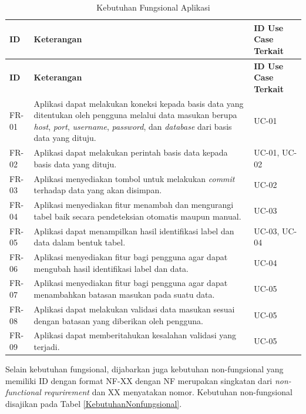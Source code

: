 	\begin{small}
	\begin{longtable}{ | p{2cm} | p{6cm} | p{4cm} | }
	    \caption{Kebutuhan Fungsional Aplikasi}
	    \label{KebutuhanFungsional}\\ \hline
	    \centering\bfseries{ID} & \centering\bfseries{Keterangan} & \centering\bfseries{ID Use Case Terkait} \tabularnewline \hline
	    \endfirsthead
	    \hline
	    \centering\bfseries{ID} & \centering\bfseries{Keterangan} & \centering\bfseries{ID Use Case Terkait} \tabularnewline \hline
	    \endhead
	    FR-01 & Aplikasi dapat melakukan koneksi kepada basis data yang ditentukan oleh pengguna melalui data masukan berupa \textit{host}, \textit{port}, \textit{username}, \textit{password}, dan \textit{database} dari basis data yang dituju. & UC-01 \\ \hline
	    FR-02 & Aplikasi dapat melakukan perintah basis data kepada basis data yang dituju. & UC-01, UC-02 \\ \hline
	    FR-03 & Aplikasi menyediakan tombol untuk melakukan \textit{commit} terhadap data yang akan disimpan. & UC-02 \\ \hline
	    FR-04 & Aplikasi menyediakan fitur menambah dan mengurangi tabel baik secara pendeteksian otomatis maupun manual. & UC-03 \\ \hline
	    FR-05 & Aplikasi dapat menampilkan hasil identifikasi label dan data dalam bentuk tabel. & UC-03, UC-04 \\ \hline
	    FR-06 & Aplikasi menyediakan fitur bagi pengguna agar dapat mengubah hasil identifikasi label dan data. & UC-04 \\ \hline
	    FR-07 & Aplikasi menyediakan fitur bagi pengguna agar dapat menambahkan batasan masukan pada suatu data. & UC-05 \\ \hline
	    FR-08 & Aplikasi dapat melakukan validasi data masukan sesuai dengan batasan yang diberikan oleh pengguna. & UC-05 \\ \hline
	    FR-09 & Aplikasi dapat memberitahukan kesalahan validasi yang terjadi. & UC-05 \\ \hline
	\end{longtable}
	\end{small}

	Selain kebutuhan fungsional, dijabarkan juga kebutuhan non-fungsional yang memiliki ID dengan format NF-XX dengan NF merupakan singkatan dari \textit{non-functional requrirement} dan XX menyatakan nomor. Kebutuhan non-fungsional disajikan pada Tabel \ref{KebutuhanNonfungsional}.

